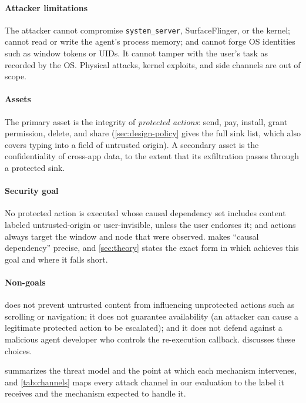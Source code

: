 \paragraph{Attacker limitations} The attacker cannot compromise \texttt{system\_server}, SurfaceFlinger, or the kernel; cannot read or write the agent's process memory; and cannot forge OS identities such as window tokens or UIDs. It cannot tamper with the user's task as recorded by the OS. Physical attacks, kernel exploits, and side channels are out of scope.

\paragraph{Assets} The primary asset is the integrity of \emph{protected actions}: send, pay, install, grant permission, delete, and share (\cref{sec:design-policy} gives the full sink list, which also covers typing into a field of untrusted origin). A secondary asset is the confidentiality of cross-app data, to the extent that its exfiltration passes through a protected sink.

\paragraph{Security goal} No protected action is executed whose causal dependency set includes content labeled untrusted-origin or user-invisible, unless the user endorses it; and actions always target the window and node that were observed.  makes ``causal dependency'' precise, and \cref{sec:theory} states the exact form in which \PG{} achieves this goal and where it falls short.

\paragraph{Non-goals} \PG{} does not prevent untrusted content from influencing unprotected actions such as scrolling or navigation; it does not guarantee availability (an attacker can cause a legitimate protected action to be escalated); and it does not defend against a malicious agent developer who controls the re-execution callback.  discusses these choices.

 summarizes the threat model and the point at which each \PG{} mechanism intervenes, and \cref{tab:channels} maps every attack channel in our evaluation to the label it receives and the mechanism expected to handle it.

